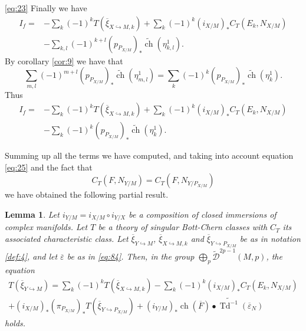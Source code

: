 \documentclass[10pt,twoside]{article}
\numberwithin{equation}{section}
\theoremstyle{plain}
\newtheorem{lemma}[equation]{Lemma}
\theoremstyle{definition}
\DeclareMathOperator{\Td}{Td}
\DeclareMathOperator{\ch}{ch}
\begin{document}
\eqref{eq:23} Finally we have
\begin{align*}
  I_{f}=&-\sum_{k}(-1)^{k} T(\overline \xi_{X\hookrightarrow M,k})
  + \sum_{k}(-1)^{k} (i_{X/M})_{\ast} C_{T}(E_{k},N_{X/M})\\
  &- \sum_{k,l}(-1)^{k+l} (p_{P_{X/M}})_{\ast}\widetilde
  {\ch}(\eta^{1}_{k,l}). 
\end{align*}
By corollary \ref{cor:9} we have that
\begin{displaymath}
  \sum_{m,l}(-1)^{m+l} (p_{P_{X/M}})_{\ast}\widetilde
  {\ch}(\eta^{1}_{m,l})=\sum_{k}(-1)^{k} (p_{P_{X/M}})_{\ast}\widetilde
  {\ch}(\eta^{1}_{k}).
\end{displaymath}
Thus 
\begin{align*}
  I_{f}=&-\sum_{k}(-1)^{k} T(\overline \xi_{X\hookrightarrow M,k})
  + \sum_{k}(-1)^{k} (i_{X/M})_{\ast} C_{T}(E_{k},N_{X/M})\\
  &- \sum_{k}(-1)^{k} (p_{P_{X/M}})_{\ast}\widetilde
  {\ch}(\eta^{1}_{k}). 
\end{align*}

Summing up all the terms we have computed, and taking into account
equation \eqref{eq:25} and the fact that
\begin{displaymath}
  C_{T}(F,N_{Y/M})=C_{T}(F,N_{Y/P_{X/M}})  
\end{displaymath}
we have obtained the following partial result.

\begin{lemma} \label{lemm:2}
  Let $i_{Y/M}=i_{X/M}\circ i_{Y/X}$ be a composition of closed
  immersions of complex manifolds. Let $T$ be a theory of singular
  Bott-Chern classes with $C_{T}$ its associated characteristic
  class. Let $\overline \xi_{Y\hookrightarrow M}$, 
  $\overline \xi _{X\hookrightarrow M,k}$ 
  and $\overline \xi_{Y\hookrightarrow P_{X/M}}$
  be as in notation \ref{def:4}, and let $\overline {\varepsilon }$ be
  as in \eqref{eq:84}.
  Then, in the group $\bigoplus_{p}\widetilde{\mathcal{D}}^{2p-1}(M,p)$,
  the equation
  \begin{multline}\label{eq:50}
    T(\overline \xi_{Y\hookrightarrow M})=
    \sum_{k}(-1)^{k}T(\overline \xi _{X\hookrightarrow M,k})-\sum_{k}(-1)^{k}
    (i_{X/M})_{\ast}C_{T}(E_{k},N_{X/M})\\+
    (i_{X/M})_{\ast}(\pi _{P_{X/M}})_{\ast} 
    T(\overline \xi_{Y\hookrightarrow P_{X/M}})+
    (i_{Y/M})_{\ast}\ch(\overline F)\bullet\widetilde
    {\Td^{-1}}(\overline {\varepsilon }_{N})
  \end{multline}
  holds.
\end{lemma}
\end{document}
